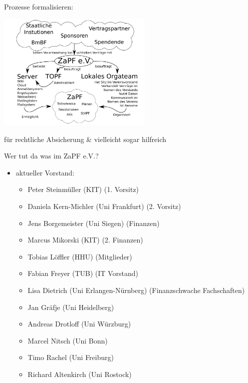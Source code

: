 \documentclass[compress, aspectratio=169]{beamer}
\begin{document}
\thispagestyle{empty}
\begin{frame}{Prozesse formalisieren:}
  \begin{center}
    \includegraphics[width=0.56\textwidth]{aussen}
  \end{center}
    für rechtliche Absicherung \& vielleicht sogar hilfreich
\end{frame}


\thispagestyle{empty}
\begin{frame}{Wer tut da was im ZaPF e.V.?}
    \begin{itemize}
        \item[] aktueller Vorstand:
        \begin{itemize}
             \item Peter Steinmüller (KIT) (1. Vorsitz)
             \item Daniela Kern-Michler (Uni Frankfurt) (2. Vorsitz)
             \item Jens Borgemeister (Uni Siegen) (Finanzen)
             \item Marcus Mikorski (KIT) (2. Finanzen)
             \item Tobias Löffler (HHU) (Mitglieder)
             \item Fabian Freyer (TUB) (IT Vorstand)
             \item Lisa Dietrich (Uni Erlangen-Nürnberg)  (Finanzschwache Fachschaften)
             \item Jan Gräfje (Uni Heidelberg)
             \item Andreas Drotloff (Uni Würzburg)
             \item Marcel Nitsch (Uni Bonn)
             \item Timo Rachel (Uni Freiburg)
             \item Richard Altenkirch (Uni Rostock)
        \end{itemize}
    \end{itemize}
\end{frame}
\end{document}

